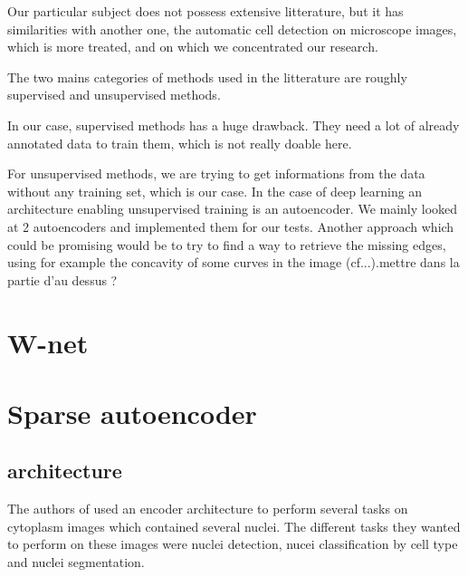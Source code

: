 \documentclass{report}
\begin{document}
Our particular subject does not possess extensive litterature, but it has similarities with another one, the automatic cell detection on microscope images, which is more treated, and on which we concentrated our research.

The two mains categories of methods used in the litterature are roughly supervised and unsupervised methods.  \newline

In our case, supervised methods has a huge drawback. They need a lot of already annotated data to train them, which is not really doable here.  \newline

For unsupervised methods, we are trying to get informations from the data without any training set, which is our case.
In the case of deep learning an architecture enabling unsupervised training is an autoencoder. We mainly looked at 2 autoencoders and implemented them for our tests.\newline\newline
Another approach which could be promising would be to try to find a way to retrieve the missing edges, using for example the concavity of some curves in the image (cf...). mettre dans la partie d'au dessus ?

\section{W-net}

\section{Sparse autoencoder}
\subsection{architecture}
The authors of \cite{ref} used an encoder architecture to perform several tasks on cytoplasm images which contained several nuclei.
The different tasks they wanted to perform on these images were nuclei detection, nucei classification by cell type and nuclei segmentation.\newline
\end{document}
